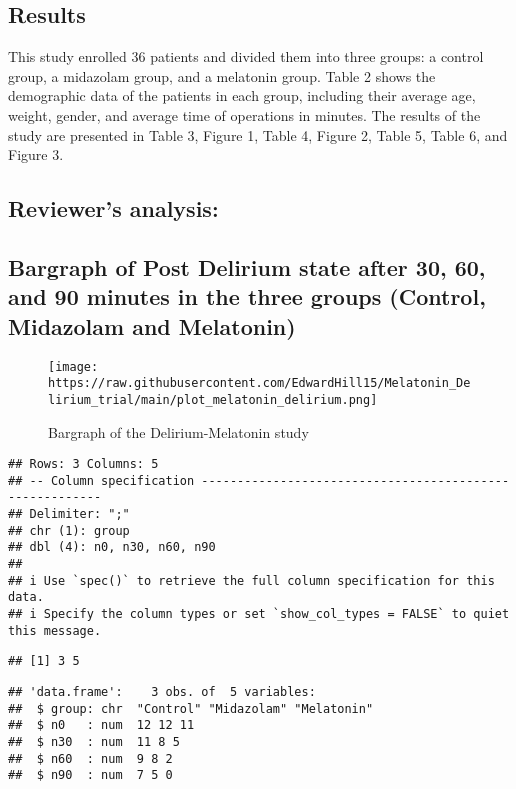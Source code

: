 \documentclass[
]{article}
\begin{document}
\hypertarget{results}{%
\subsection{Results}\label{results}}

This study enrolled 36 patients and divided them into three groups: a
control group, a midazolam group, and a melatonin group. Table 2 shows
the demographic data of the patients in each group, including their
average age, weight, gender, and average time of operations in minutes.
The results of the study are presented in Table 3, Figure 1, Table 4,
Figure 2, Table 5, Table 6, and Figure 3.

\hypertarget{reviewers-analysis}{%
\subsection{Reviewer's analysis:}\label{reviewers-analysis}}

\hypertarget{bargraph-of-post-delirium-state-after-30-60-and-90-minutes-in-the-three-groups-control-midazolam-and-melatonin}{%
\subsection{Bargraph of Post Delirium state after 30, 60, and 90 minutes
in the three groups (Control, Midazolam and
Melatonin)}\label{bargraph-of-post-delirium-state-after-30-60-and-90-minutes-in-the-three-groups-control-midazolam-and-melatonin}}

\begin{figure}
\centering
\texttt{[image: https://raw.githubusercontent.com/EdwardHill15/Melatonin\_Delirium\_trial/main/plot\_melatonin\_delirium.png]}
\caption{Bargraph of the Delirium-Melatonin study}
\end{figure}

\begin{verbatim}
## Rows: 3 Columns: 5
## -- Column specification --------------------------------------------------------
## Delimiter: ";"
## chr (1): group
## dbl (4): n0, n30, n60, n90
## 
## i Use `spec()` to retrieve the full column specification for this data.
## i Specify the column types or set `show_col_types = FALSE` to quiet this message.
\end{verbatim}

\begin{verbatim}
## [1] 3 5
\end{verbatim}

\begin{verbatim}
## 'data.frame':    3 obs. of  5 variables:
##  $ group: chr  "Control" "Midazolam" "Melatonin"
##  $ n0   : num  12 12 11
##  $ n30  : num  11 8 5
##  $ n60  : num  9 8 2
##  $ n90  : num  7 5 0
\end{verbatim}
\end{document}
